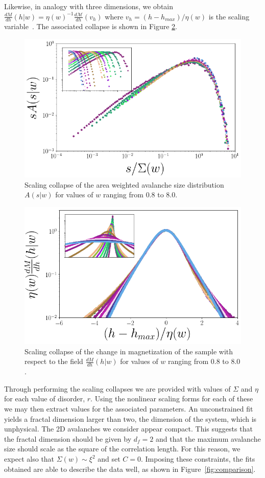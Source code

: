 \documentclass[reprint,amsmath,amssymb,aps,floatfix]{revtex4-1}
\begin{document}
%
Likewise, in analogy with three dimensions, we obtain $\frac{dM}{dh}(h|w)=\eta(w)^{-1}\frac{d\mathcal{M}}{dh}(v_h)$ where $v_h=(h-h_{max})/\eta(w)$ is the scaling variable~\cite[Section~\ref{supp-app:magscale}]{RFIM2Dsupp}. The associated collapse is shown in Figure \ref{fig:dMdh_collapse}.
%
\begin{figure}
	\includegraphics[scale=0.3]{A_collapse_inset.png}
  	\caption{Scaling collapse of the area weighted avalanche size distribution $A(s|w)$ for values of $w$ ranging from $0.8$ to $8.0$.}
  	\label{fig:As_collapse}
\end{figure}
%
\begin{figure}
	\includegraphics[scale=0.3]{dMdh_collapse_inset.png}
  	\caption{ Scaling collapse of the change in magnetization of the sample with respect to the field $\frac{dM}{dh}(h|w)$ for values of $w$ ranging from $0.8$ to $8.0$. }
  	\label{fig:dMdh_collapse}
\end{figure}
%
Through performing the scaling collapses we are provided with values of $\Sigma$ and $\eta$ for each value of disorder, $r$.  Using the nonlinear scaling forms for each of these we may then extract values for the associated parameters. An unconstrained fit yields a fractal dimension larger than two, the dimension of the system, which is unphysical. The 2D avalanches we consider appear compact. This suggests that the fractal dimension should be given by $d_f=2$ and that the maximum avalanche size should scale as the square of the correlation length. For this reason, we expect also that $\Sigma(w)\sim\xi^2$ and set $C=0$. Imposing these constraints, the fits obtained are able to describe the data well, as shown in Figure~\ref{fig:comparison}.\par
\end{document}
